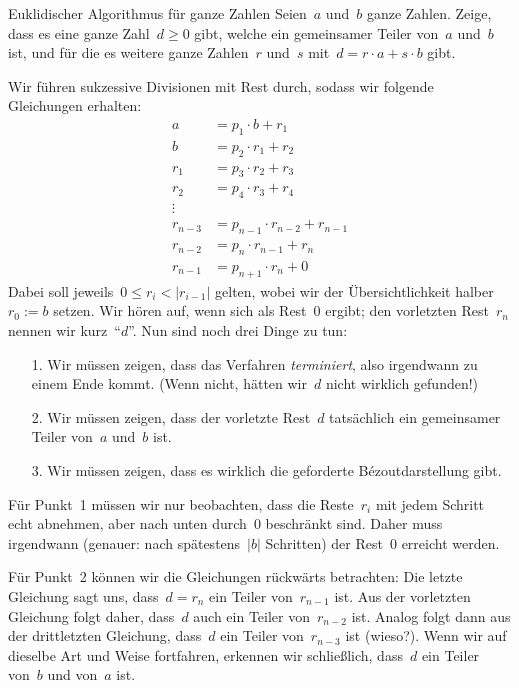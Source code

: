 \documentclass{algblatt}
\begin{document}
\ifloesungen\newpage\fi
\begin{aufgabe}{Euklidischer Algorithmus für ganze Zahlen}
Seien~$a$ und~$b$ ganze Zahlen. Zeige, dass es eine ganze Zahl~$d
\geq 0$ gibt, welche ein gemeinsamer Teiler von~$a$ und~$b$ ist, und für die es
weitere ganze Zahlen~$r$ und~$s$ mit~$d = r \cdot a + s \cdot b$ gibt.

\begin{loesung}
Wir führen sukzessive Divisionen mit Rest durch, sodass wir folgende
Gleichungen erhalten:
\begin{align*}
  a &= p_1 \cdot b + r_1 \\
  b &= p_2 \cdot r_1 + r_2 \\
  r_1 &= p_3 \cdot r_2 + r_3 \\
  r_2 &= p_4 \cdot r_3 + r_4 \\
  \vdots \\
  r_{n-3} &= p_{n-1} \cdot r_{n-2} + r_{n-1} \\
  r_{n-2} &= p_{n} \cdot r_{n-1} + r_{n} \\
  r_{n-1} &= p_{n+1} \cdot r_{n} + 0
\end{align*}
Dabei soll jeweils~$0 \leq r_i < |r_{i-1}|$ gelten, wobei wir der
Übersichtlichkeit halber~$r_0 := b$ setzen. Wir hören auf, wenn sich als
Rest~$0$ ergibt; den vorletzten Rest~$r_n$ nennen wir kurz~"`$d$"'. Nun sind
noch drei Dinge zu tun:
\begin{enumerate}
\item[1.] Wir müssen zeigen, dass das Verfahren \emph{terminiert}, also
irgendwann zu einem Ende kommt. (Wenn nicht, hätten wir~$d$ nicht wirklich
gefunden!)
\item[2.] Wir müssen zeigen, dass der vorletzte Rest~$d$ tatsächlich ein
gemeinsamer Teiler von~$a$ und~$b$ ist.
\item[3.] Wir müssen zeigen, dass es wirklich die geforderte Bézoutdarstellung
gibt.
\end{enumerate}
Für Punkt~1 müssen wir nur beobachten, dass die Reste~$r_i$ mit jedem Schritt
echt abnehmen, aber nach unten durch~$0$ beschränkt sind. Daher muss
irgendwann (genauer: nach spätestens~$|b|$ Schritten) der Rest~$0$
erreicht werden.

Für Punkt~2 können wir die Gleichungen rückwärts betrachten: Die letzte
Gleichung sagt uns, dass~$d = r_n$ ein Teiler von~$r_{n-1}$ ist. Aus der
vorletzten Gleichung folgt daher, dass~$d$ auch ein Teiler von~$r_{n-2}$ ist.
Analog folgt dann aus der drittletzten Gleichung, dass~$d$ ein Teiler
von~$r_{n-3}$ ist (wieso?). Wenn wir auf dieselbe Art und Weise fortfahren,
erkennen wir schließlich, dass~$d$ ein Teiler von~$b$ und von~$a$ ist.


\end{loesung}
\end{aufgabe}
\end{document}
